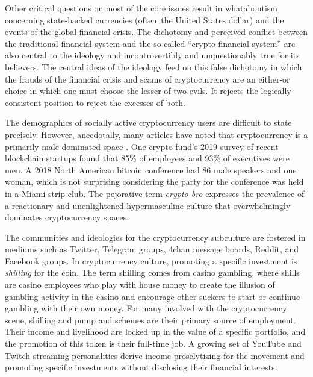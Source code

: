 
Other critical questions on most of the core issues result in whataboutism
concerning state-backed currencies (often the United States dollar) and the
events of the global financial crisis. The dichotomy and perceived conflict
between the traditional financial system and the so-called ``crypto financial
system'' are also central to the ideology and incontrovertibly and
unquestionably true for its believers. The central ideas of the ideology feed on
this false dichotomy in which the frauds of the financial crisis and scams of
cryptocurrency are an either-or choice in which one must choose the lesser of
two evils. It rejects the logically consistent position to reject the excesses
of both. \cite{golumbia_zealots_2018, wolf_libertarian_2019,
golumbia_cyberlibertarians_2013}


The demographics of socially active cryptocurrency users are difficult to state
precisely. However, anecdotally, many articles have noted that cryptocurrency is
a primarily male-dominated space \cite{penny_four_2018}. One crypto fund's 2019
survey of recent blockchain startups found that 85\% of employees and 93\% of
executives were men. A 2018 North American bitcoin conference had 86 male
speakers and one woman, which is not surprising considering the party for the
conference was held in a Miami strip club. The pejorative term \textit{crypto
bro} expresses the prevalence of a reactionary and unenlightened hypermasculine
culture that overwhelmingly dominates cryptocurrency spaces.


The communities and ideologies for the cryptocurrency subculture are fostered in
mediums such as Twitter, Telegram groups, 4chan message boards, Reddit, and
Facebook groups. In cryptocurrency culture, promoting a specific investment is
\textit{shilling} for the coin. The term shilling comes from casino gambling,
where shills are casino employees who play with house money to create the
illusion of gambling activity in the casino and encourage other suckers to start
or continue gambling with their own money. For many involved with the
cryptocurrency scene, shilling and pump and schemes are their primary source of
employment. Their income and livelihood are locked up in the value of a specific
portfolio, and the promotion of this token is their full-time job. A growing set
of YouTube and Twitch streaming personalities derive income proselytizing for
the movement and promoting specific investments without disclosing their
financial interests. \cite{powell_crypto-shills_2019}

